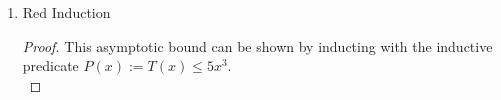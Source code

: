 \documentclass[10pt]{article}
\begin{document}
\begin{enumerate}[label={}]
\begin{proof}
                  $$
                        \begin{aligned}
                              \sum_{r=0}^{\log _5 (x)-1} 100^r \cdot \frac{x^3}{125^r} & =x^3 \cdot \sum_{r=0}^{\log _5 (x)-1}\left(\frac{100}{125}\right)^r     \\
                                                                                       & =x^3 \cdot \sum_{r=0}^{\log _5 (x)-1}\left(\frac{4}{5}\right)^r         \\
                                                                                       & =x^3 \cdot \frac{1-\left(\frac{4}{5}\right)^{\log _5 x}}{1-\frac{4}{5}} \\
                                                                                       & =5 x^3\left(1-\left(\frac{4}{5}\right)^{\log _5 x}\right)               \\
                                                                                       & =5 x^3\left(1-\frac{4^{\log _5 x}}{5^{\log _5 x}}\right)                \\
                                                                                       & =5 x^3\left(1-\frac{x^{\log _5 4}}{x^{\log _5 5}}\right)                \\
                                                                                       & =5 x^3\left(1-x^{\log _5 (4)-1}\right)                                  \\
                                                                                       & =5 x^3-5 \cdot x^{3+\log _5 (4)-1}                                      \\
                                                                                       & =5 x^3-5 \cdot x^{2+\log _5 4}
                        \end{aligned}
                  $$


                  Since the total work $5 x^3-5 \cdot x^{2+\log _5 4}$ is always less than or equal to $5 x^3$ for $x \geq 1$ because $0 < \log _5 4 < 1$, it follows that $T(x)=5 x^3-5 \cdot x^{2+\log _5 4} \in O\left(x^3\right)$.

            \end{proof}

            \newpage

      \item Red Induction
            \begin{proof}
                  This asymptotic bound can be shown by inducting with the inductive predicate $P(x):=T(x) \leq 5 x^3$.\\


\end{proof}
\end{enumerate}
\end{document}
